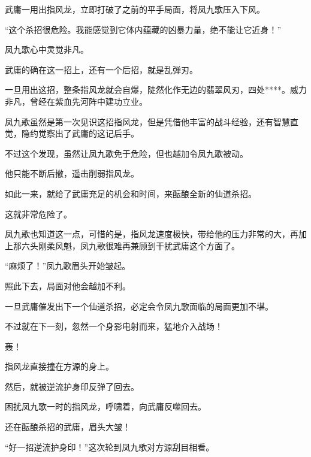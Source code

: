 \begin{this_body}
武庸一用出指风龙，立即打破了之前的平手局面，将凤九歌压入下风。

“这个杀招很危险。我能感觉到它体内蕴藏的凶暴力量，绝不能让它近身！”

凤九歌心中灵觉非凡。

武庸的确在这一招上，还有一个后招，就是乱弹刃。

一旦用出这招，整条指风龙就会自爆，陡然化作无边的翡翠风刃，四处****。威力非凡，曾经在紫血先河阵中建功立业。

凤九歌虽然是第一次见识这招指风龙，但是凭借他丰富的战斗经验，还有智慧直觉，隐约觉察出了武庸的这记后手。

不过这个发现，虽然让凤九歌免于危险，但也越加令凤九歌被动。

他只能不断后撤，遥击削弱指风龙。

如此一来，就给了武庸充足的机会和时间，来酝酿全新的仙道杀招。

这就非常危险了。

凤九歌也知道这一点，可惜的是，指风龙速度极快，带给他的压力非常的大，再加上那六头刚柔风魁，凤九歌很难再兼顾到干扰武庸这个方面了。

“麻烦了！”凤九歌眉头开始皱起。

照此下去，局面对他会越加不利。

一旦武庸催发出下一个仙道杀招，必定会令凤九歌面临的局面更加不堪。

不过就在下一刻，忽然一个身影电射而来，猛地介入战场！

轰！

指风龙直接撞在方源的身上。

然后，就被逆流护身印反弹了回去。

困扰凤九歌一时的指风龙，呼啸着，向武庸反噬回去。

还在酝酿杀招的武庸，眉头大皱！

“好一招逆流护身印！”这次轮到凤九歌对方源刮目相看。

\end{this_body}


